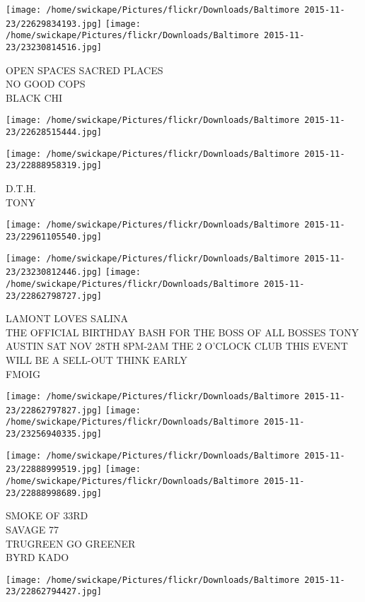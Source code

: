 \documentclass[10pt,letterpaper]{article}
\begin{document}
\vspace{0.25in}
\texttt{[image: /home/swickape/Pictures/flickr/Downloads/Baltimore 2015-11-23/22629834193.jpg]}
\texttt{[image: /home/swickape/Pictures/flickr/Downloads/Baltimore 2015-11-23/23230814516.jpg]}

OPEN SPACES SACRED PLACES\\
NO GOOD COPS\\
BLACK CHI
\pagebreak

\texttt{[image: /home/swickape/Pictures/flickr/Downloads/Baltimore 2015-11-23/22628515444.jpg]}

\vspace{0.25in}
\texttt{[image: /home/swickape/Pictures/flickr/Downloads/Baltimore 2015-11-23/22888958319.jpg]}

D.T.H.\\
TONY
\pagebreak

\texttt{[image: /home/swickape/Pictures/flickr/Downloads/Baltimore 2015-11-23/22961105540.jpg]}

\vspace{0.25in}
\texttt{[image: /home/swickape/Pictures/flickr/Downloads/Baltimore 2015-11-23/23230812446.jpg]}
\texttt{[image: /home/swickape/Pictures/flickr/Downloads/Baltimore 2015-11-23/22862798727.jpg]}

LAMONT LOVES SALINA\\
THE OFFICIAL BIRTHDAY BASH FOR THE BOSS OF ALL BOSSES TONY AUSTIN SAT NOV 28TH 8PM{-}2AM THE 2 O'CLOCK CLUB THIS EVENT WILL BE A SELL{-}OUT THINK EARLY\\
FMOIG
\pagebreak

\texttt{[image: /home/swickape/Pictures/flickr/Downloads/Baltimore 2015-11-23/22862797827.jpg]}
\texttt{[image: /home/swickape/Pictures/flickr/Downloads/Baltimore 2015-11-23/23256940335.jpg]}

\texttt{[image: /home/swickape/Pictures/flickr/Downloads/Baltimore 2015-11-23/22888999519.jpg]}
\texttt{[image: /home/swickape/Pictures/flickr/Downloads/Baltimore 2015-11-23/22888998689.jpg]}

SMOKE OF 33RD\\
SAVAGE 77\\
TRUGREEN GO GREENER\\
BYRD KADO
\pagebreak

\texttt{[image: /home/swickape/Pictures/flickr/Downloads/Baltimore 2015-11-23/22862794427.jpg]}
\end{document}
